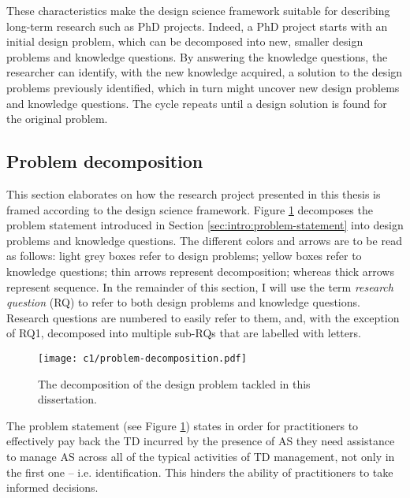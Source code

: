 These characteristics make the design science framework suitable for describing long-term research such as PhD projects.
Indeed, a PhD project starts with an initial design problem, which can be decomposed into new, smaller design problems and knowledge questions.
By answering the knowledge questions, the researcher can identify, with the new knowledge acquired, a solution to the design problems previously identified, which in turn might uncover new design problems and knowledge questions.
The cycle repeats until a design solution is found for the original problem.

\subsection{Problem decomposition}
This section elaborates on how the research project presented in this thesis is framed according to the design science framework. 
Figure \ref{fig:intro:problem-decomposition} decomposes the problem statement introduced in Section \ref{sec:intro:problem-statement} into design problems and knowledge questions.
The different colors and arrows are to be read as follows: light grey boxes refer to design problems; yellow boxes refer to knowledge questions; thin arrows represent decomposition; whereas thick arrows represent sequence.
In the remainder of this section, I will use the term \emph{research question} (RQ) to refer to both design problems and knowledge questions.
Research questions are numbered to easily refer to them, and, with the exception of RQ1, decomposed into multiple sub-RQs that are labelled with letters.

\begin{figure}
    \centering
    \texttt{[image: c1/problem-decomposition.pdf]}
    \caption{The decomposition of the design problem tackled in this dissertation.}\label{fig:intro:problem-decomposition}
\end{figure}

The problem statement (see Figure \ref{fig:intro:problem-decomposition}) states in order for practitioners to effectively pay back the TD incurred by the presence of AS they need assistance to manage AS across all of the typical activities of TD management, not only in the first one -- i.e. identification.
This hinders the ability of practitioners to take informed decisions.

